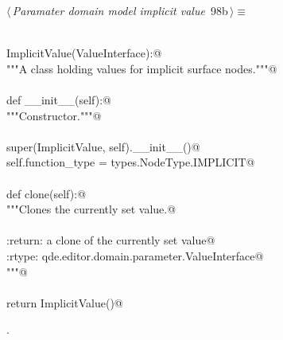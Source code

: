 \documentclass[
    a4paper,      %
    10pt,         %
    openright,    %
    notitlepage,  %
    parskip=half, %
]{scrreprt}       %
\theoremstyle{definition}                    %
\begin{document}
\begin{flushleft} \small
\begin{minipage}{\linewidth}\label{scrap158}\raggedright\small
{} $\langle\,${\itshape Paramater domain model implicit value}\nobreak\ {\footnotesize {98b}}$\,\rangle\equiv$
\vspace{-1exm}
\begin{list}{}{} \item
\mbox{}\lstinline@@\\
\mbox{}\lstinline@class ImplicitValue(ValueInterface):@\\
\mbox{}\lstinline@    """A class holding values for implicit surface nodes."""@\\
\mbox{}\lstinline@@\\
\mbox{}\lstinline@    def __init__(self):@\\
\mbox{}\lstinline@        """Constructor."""@\\
\mbox{}\lstinline@@\\
\mbox{}\lstinline@        super(ImplicitValue, self).__init__()@\\
\mbox{}\lstinline@        self.function_type = types.NodeType.IMPLICIT@\\
\mbox{}\lstinline@@\\
\mbox{}\lstinline@    def clone(self):@\\
\mbox{}\lstinline@        """Clones the currently set value.@\\
\mbox{}\lstinline@@\\
\mbox{}\lstinline@        :return: a clone of the currently set value@\\
\mbox{}\lstinline@        :rtype:  qde.editor.domain.parameter.ValueInterface@\\
\mbox{}\lstinline@        """@\\
\mbox{}\lstinline@@\\
\mbox{}\lstinline@        return ImplicitValue()@{\NWsep}
\end{list}
\vspace{-1.5ex}
\footnotesize
\begin{list}{}{\setlength{\itemsep}{-\parsep}\setlength{\itemindent}{-\leftmargin}}
\item {\NWtxtMacroNoRef}.

\item{}
\end{list}
\end{minipage}\vspace{4ex}
\end{flushleft}
\end{document}
